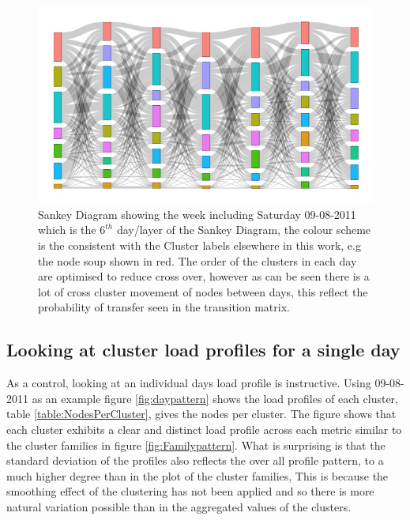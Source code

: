 \begin{figure}[ht]
    \centering
    \includegraphics[width=\textwidth]{Figures/Results/SankeyWeek.png}
    \caption[Sankey diagram for 1 week]{Sankey Diagram showing the week including Saturday 09-08-2011 which is the $6^{th}$ day/layer of the Sankey Diagram, the colour scheme is the consistent with the Cluster labels elsewhere in this work, e.g the node soup shown in red. The order of the clusters in each day are optimised to reduce cross over, however as can be seen there is a lot of cross cluster movement of nodes between days, this reflect the probability of transfer seen in the transition matrix. }
    \label{fig:SankeyWeek}
\end{figure}


\subsection{Looking at cluster load profiles for a single day}

As a control, looking at an individual days load profile is instructive. Using 09-08-2011 as an example figure \ref{fig:daypattern} shows the load profiles of each cluster, table \ref{table:NodesPerCluster}, gives the nodes per cluster. The figure shows that each cluster exhibits a clear and distinct load profile across each metric similar to the cluster families in figure \ref{fig:Familypattern}. What is surprising is that the standard deviation of the profiles also reflects the over all profile pattern, to a much higher degree than in the plot of the cluster families, This is because the smoothing effect of the clustering has not been applied and so there is more natural variation possible than in the aggregated values of the clusters.

